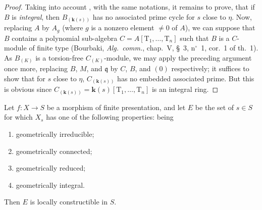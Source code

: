 \begin{proof}
Taking into account , with the same notations, it remains to prove, that if $B$ is \emph{integral}, then $B_{(\boldsymbol{k}(s))}$ has no associated prime cycle for $s$ close to $\eta$.
Now, replacing $A$ by $A_g$ (where $g$ is a nonzero element $\neq 0$ of $A$), we can suppose that $B$ contains a polynomial sub-algebra $C=A[\mathrm{T}_1,\ldots,\mathrm{T}_n]$ such that $B$ is a $C$-module of finite type (Bourbaki, \emph{Alg.\ comm.}, chap.\ V, \S~3, n$^\circ$~1, cor.\ 1 of th.\ 1).
As $B_{(K)}$ is a torsion-free $C_{(K)}$-module, we may apply the preceding argument once more, replacing $B$, $M$, and $\mathfrak{q}$ by $C$, $B$, and $(0)$ respectively; it suffices to show that for $s$ close to $\eta$, $C_{(\boldsymbol{k}(s))}$ has no embedded associated prime.
But this is obvious since $C_{(\boldsymbol{k}(s))}=\boldsymbol{k}(s)[\mathrm{T}_1,\ldots,\mathrm{T}_n]$ is an integral ring.
\end{proof}

\begin{theorem}[9.7.7]
\label{IV.9.7.7}
Let $f:X\to S$ be a morphism of finite presentation, and let $E$ be the set of $s\in S$ for which $X_s$ has one of the following properties: being
\begin{enumerate}[label=(\roman*)]
  \item geometrically irreducible;
  \item geometrically connected;
  \item geometrically reduced;
  \item geometrically integral.
\end{enumerate}
Then $E$ is locally constructible in $S$.
\end{theorem}

